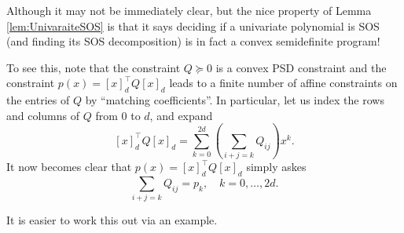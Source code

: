 \documentclass[
]{book}
\theoremstyle{definition}
\theoremstyle{definition}
\theoremstyle{definition}
\theoremstyle{definition}
\theoremstyle{remark}
\begin{document}
Although it may not be immediately clear, but the nice property of Lemma \ref{lem:UnivaraiteSOS} is that it says deciding if a univariate polynomial is SOS (and finding its SOS decomposition) is in fact a convex semidefinite program!

To see this, note that the constraint \(Q \succeq 0\) is a convex PSD constraint and the constraint \(p(x) = [x]_d^\top Q [x]_d\) leads to a finite number of affine constraints on the entries of \(Q\) by ``matching coefficients''. In particular, let us index the rows and columns of \(Q\) from \(0\) to \(d\), and expand
\[
[x]_d^\top Q [x]_d = \sum_{k=0}^{2d} \left( \sum_{i+j=k} Q_{ij} \right) x^k.
\]
It now becomes clear that \(p(x) = [x]_d^\top Q [x]_d\) simply askes
\[
\sum_{i+j=k} Q_{ij} = p_k, \quad k = 0, \dots, 2d.
\]

It is easier to work this out via an example.
\end{document}

